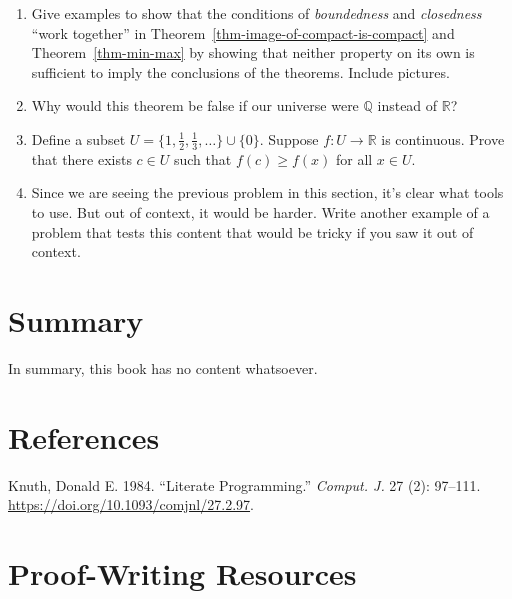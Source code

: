 \documentclass[
  letterpaper,
  DIV=11,
  numbers=noendperiod]{scrreprt}
\newlength{\cslhangindent}
\newenvironment{CSLReferences}[2] %
 {\begin{list}{}{%
  \setlength{\itemindent}{0pt}
  \setlength{\leftmargin}{0pt}
  \setlength{\parsep}{0pt}
  \ifodd #1
   \setlength{\leftmargin}{\cslhangindent}
   \setlength{\itemindent}{-1\cslhangindent}
  \fi
  \setlength{\itemsep}{#2\baselineskip}}}
 {\end{list}}
\providecommand{\tightlist}{%
  \setlength{\itemsep}{0pt}\setlength{\parskip}{0pt}}
\def\R{\mathbb R}
\def\Q{\mathbb Q}
\theoremstyle{plain}
\theoremstyle{definition}
\theoremstyle{plain}
\theoremstyle{plain}
\theoremstyle{definition}
\theoremstyle{definition}
\theoremstyle{remark}
\begin{document}
\begin{enumerate}
\def\labelenumi{\arabic{enumi}.}
\tightlist
\item
  Give examples to show that the conditions of \emph{boundedness} and
  \emph{closedness} ``work together'' in
  Theorem~\ref{thm-image-of-compact-is-compact} and
  Theorem~\ref{thm-min-max} by showing that neither property on its own
  is sufficient to imply the conclusions of the theorems. Include
  pictures.
\item
  Why would this theorem be false if our universe were \(\Q\) instead of
  \(\R\)?
\item
  Define a subset \(U=\{1,\frac{1}{2},\frac{1}{3},\ldots\}\cup\{0\}\).
  Suppose \(f:U\rightarrow\R\) is continuous. Prove that there exists
  \(c\in U\) such that \(f(c)\geq f(x)\) for all \(x\in U\).
\item
  Since we are seeing the previous problem in this section, it's clear
  what tools to use. But out of context, it would be harder. Write
  another example of a problem that tests this content that would be
  tricky if you saw it out of context.
\end{enumerate}


\chapter{Summary}\label{summary}

In summary, this book has no content whatsoever.


\chapter*{References}\label{references}


\label{refs}
\begin{CSLReferences}{1}{0}
Knuth, Donald E. 1984. {``Literate Programming.''} \emph{Comput. J.} 27
(2): 97--111. \url{https://doi.org/10.1093/comjnl/27.2.97}.

\end{CSLReferences}

\cleardoublepage
{}
{}
\appendix

\chapter{Proof-Writing Resources}\label{sec-proof-writing}
\end{document}
